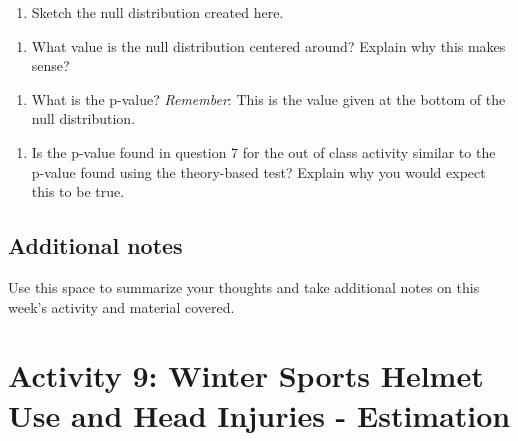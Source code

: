 \documentclass[
]{report}
\providecommand{\tightlist}{%
  \setlength{\itemsep}{0pt}\setlength{\parskip}{0pt}}
\begin{document}
\begin{enumerate}
\def\labelenumi{\arabic{enumi}.}
\setcounter{enumi}{4}
\tightlist
\item
  Sketch the null distribution created here.
\end{enumerate}

\newpage

\begin{enumerate}
\def\labelenumi{\arabic{enumi}.}
\setcounter{enumi}{5}
\tightlist
\item
  What value is the null distribution centered around? Explain why this makes sense?
\end{enumerate}

\vspace{1in}

\begin{enumerate}
\def\labelenumi{\arabic{enumi}.}
\setcounter{enumi}{6}
\tightlist
\item
  What is the p-value? \emph{Remember}: This is the value given at the bottom of the null distribution.
\end{enumerate}

\vspace{0.2in}

\begin{enumerate}
\def\labelenumi{\arabic{enumi}.}
\setcounter{enumi}{7}
\tightlist
\item
  Is the p-value found in question 7 for the out of class activity similar to the p-value found using the theory-based test? Explain why you would expect this to be true.
\end{enumerate}

\vspace{1in}

\hypertarget{additional-notes}{%
\section{Additional notes}\label{additional-notes}}

Use this space to summarize your thoughts and take additional notes on this week's activity and material covered.

\hypertarget{activity-9-winter-sports-helmet-use-and-head-injuries---estimation}{%
\chapter{Activity 9: Winter Sports Helmet Use and Head Injuries - Estimation}\label{activity-9-winter-sports-helmet-use-and-head-injuries---estimation}}
\end{document}
